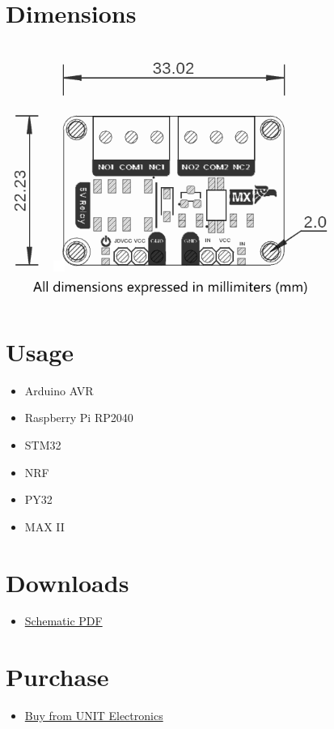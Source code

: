 \documentclass[10pt]{article}
\begin{document}
\section*{Dimensions}
\vspace{1em}
\begin{center}
\includegraphics[width=0.80\textwidth,keepaspectratio]{images/dimensions.png}
\end{center}



\section*{Usage}
\begin{itemize}
\item Arduino AVR
\item Raspberry Pi RP2040
\item STM32
\item NRF
\item PY32
\item MAX II
\end{itemize}

\section*{Downloads}
\begin{itemize}
\begin{itemize}
\item \href{docs/schematic.pdf}{Schematic PDF}
\end{itemize}
\end{itemize}

\section*{Purchase}
\begin{itemize}
\item \href{https://www.uelectronics.com}{Buy from UNIT Electronics}
\end{itemize}
\end{document}
